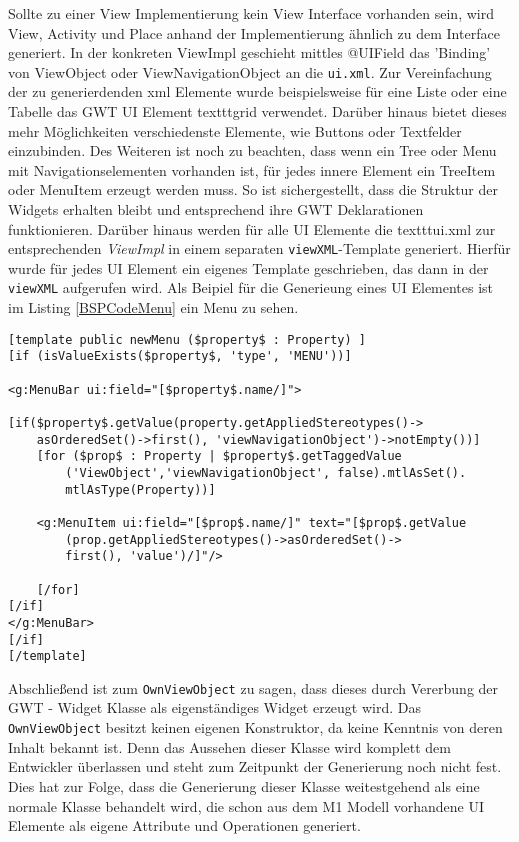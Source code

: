 Sollte zu einer View Implementierung kein View Interface vorhanden sein, wird View, Activity und Place anhand der Implementierung ähnlich zu dem Interface generiert.
In der konkreten ViewImpl geschieht mittles @UIField das 'Binding' von ViewObject oder ViewNavigationObject an die \texttt{ui.xml}. Zur Vereinfachung der zu generierdenden xml Elemente wurde beispielsweise für eine Liste oder eine Tabelle das GWT UI Element texttt{grid} verwendet. Darüber hinaus bietet dieses mehr Möglichkeiten verschiedenste Elemente, wie Buttons oder Textfelder einzubinden. Des Weiteren ist noch zu beachten, dass wenn ein Tree oder Menu mit Navigationselementen vorhanden ist, für jedes innere Element ein TreeItem oder MenuItem erzeugt werden muss. So ist sichergestellt, dass die Struktur der Widgets erhalten bleibt und entsprechend ihre GWT Deklarationen funktionieren.
Darüber hinaus werden für alle UI Elemente die texttt{ui.xml} zur entsprechenden \textit{ViewImpl} in einem separaten \texttt{viewXML}-Template generiert. Hierfür wurde für jedes UI Element ein eigenes Template geschrieben, das dann in der \texttt{viewXML} aufgerufen wird. Als Beipiel für die Generieung eines UI Elementes ist im Listing \ref{BSPCodeMenu} ein Menu zu sehen.
\lstset{language=mtl}
\begin{lstlisting}[caption={Template für die XML - Generierung eines Menus}, label={BSPCodeMenu}]
[template public newMenu ($property$ : Property) ]
[if (isValueExists($property$, 'type', 'MENU'))]

<g:MenuBar ui:field="[$property$.name/]">

[if($property$.getValue(property.getAppliedStereotypes()->
	asOrderedSet()->first(), 'viewNavigationObject')->notEmpty())]
	[for ($prop$ : Property | $property$.getTaggedValue
		('ViewObject','viewNavigationObject', false).mtlAsSet().
		mtlAsType(Property))]

	<g:MenuItem ui:field="[$prop$.name/]" text="[$prop$.getValue
		(prop.getAppliedStereotypes()->asOrderedSet()->
		first(), 'value')/]"/>

	[/for]
[/if]
</g:MenuBar>
[/if]
[/template]
\end{lstlisting}
Abschließend ist zum \texttt{OwnViewObject} zu sagen, dass dieses durch Vererbung der GWT - Widget Klasse als eigenständiges Widget erzeugt wird. Das \texttt{OwnViewObject} besitzt keinen eigenen Konstruktor, da keine Kenntnis von deren Inhalt bekannt ist. Denn das Aussehen dieser Klasse wird komplett dem Entwickler überlassen und steht zum Zeitpunkt der Generierung noch nicht fest. Dies hat zur Folge, dass die Generierung dieser Klasse weitestgehend als eine normale Klasse behandelt wird, die schon aus dem M1 Modell vorhandene UI Elemente als eigene Attribute und Operationen generiert. 
